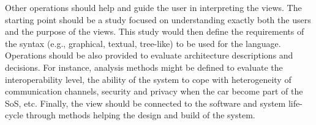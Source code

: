 Other operations should help and guide the user in interpreting the views. The starting point should be a study focused on understanding exactly both the users and the purpose of the views. This study would then define the requirements of the syntax (e.g., graphical, textual, tree-like) to be used for the language. 
Operations should be also provided to evaluate architecture descriptions and decisions. For instance, analysis methods might be defined to evaluate the interoperability level, the ability of the system to cope with heterogeneity of communication channels, security and privacy when the car become part of the SoS, etc.
Finally, the view should be connected to the software and system life-cycle through methods helping the design and build of the system.

%
%
%
%
%
%

